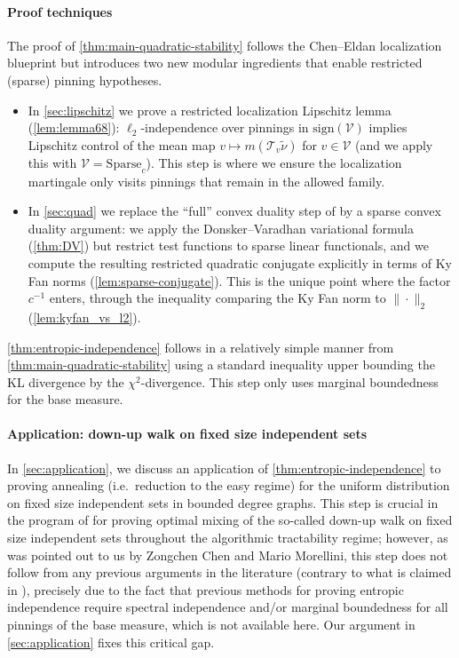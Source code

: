 \documentclass[11pt,reqno,letterpaper]{amsart}
\numberwithin{equation}{section}
\theoremstyle{definition}
\newcommand{\mc}{\mathcal}
\begin{document}
\paragraph{\bf Proof techniques}
The proof of \cref{thm:main-quadratic-stability} follows the Chen--Eldan localization blueprint but introduces
two new modular ingredients that enable {restricted} (sparse) pinning hypotheses.

\begin{itemize}
\item In \cref{sec:lipschitz} we prove a {restricted localization Lipschitz lemma}
(\cref{lem:lemma68}): $\ell_2$-independence over pinnings in $\mathrm{sign}(\mc V)$ implies Lipschitz control of
the mean map $v\mapsto m(\mc T_v\widetilde{\nu})$ for $v\in\mc V$ (and we apply this with
$\mc V=\mathrm{Sparse}_c$). This step is where we ensure the localization martingale only visits pinnings that
remain in the allowed family.

\item In \cref{sec:quad} we replace the ``full'' convex duality step of \cite{chen2022localization}
by a {sparse} convex duality argument: we apply the Donsker--Varadhan variational formula
(\cref{thm:DV}) but restrict test functions to {sparse linear} functionals, and we compute the resulting
restricted quadratic conjugate explicitly in terms of Ky Fan norms (\cref{lem:sparse-conjugate}). This is the
unique point where the factor $c^{-1}$ enters, through the inequality comparing the Ky Fan norm to $\|\cdot\|_2$
(\cref{lem:kyfan_vs_l2}). 
\end{itemize}

\cref{thm:entropic-independence} follows in a relatively simple manner from \cref{thm:main-quadratic-stability} using a standard inequality upper bounding the KL divergence by the $\chi^2$-divergence. This step only uses marginal boundedness for the base measure.\\ 

\paragraph{\bf Application: down-up walk on fixed size independent sets} In \cref{sec:application}, we discuss an application of \cref{thm:entropic-independence} to proving annealing (i.e.~reduction to the easy regime) for the uniform distribution on fixed size independent sets in bounded degree graphs. This step is crucial in the program of \cite{JMPV} for proving optimal mixing of the so-called down-up walk on fixed size independent sets throughout the algorithmic tractability regime; however, as was pointed out to us by Zongchen Chen and Mario Morellini, this step does not follow from any previous arguments in the literature (contrary to what is claimed in \cite{JMPV}), precisely due to the fact that previous methods for proving entropic independence require spectral independence and/or marginal boundedness for all pinnings of the base measure, which is not available here. Our argument in \cref{sec:application} fixes this critical gap.   
\end{document}
